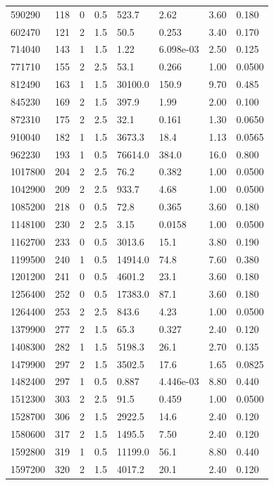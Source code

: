 \documentclass[preview]{standalone}
\begin{document}
{{\begin{tabular}{L{1.2cm}C{1.2cm} C{0.3cm}C{0.5cm} C{1.4cm}C{1.4cm} C{1.4cm}C{1.4cm}}
  590290  &   118  & 0     & 0.5 &  523.7  & 2.62  & 3.60 &  0.180   \\ 
  602470  &   121  & 2     & 1.5 &  50.5  & 0.253  & 3.40 &  0.170   \\ 
  714040  &   143  & 1     & 1.5 &  1.22  & 6.098e-03  & 2.50 &  0.125   \\ 
  771710  &   155  & 2     & 2.5 &  53.1  & 0.266  & 1.00 &  0.0500   \\ 
  812490  &   163  & 1     & 1.5 &  30100.0  & 150.9  & 9.70 &  0.485   \\ 
  845230  &   169  & 2     & 1.5 &  397.9  & 1.99  & 2.00 &  0.100   \\ 
  872310  &   175  & 2     & 2.5 &  32.1  & 0.161  & 1.30 &  0.0650   \\ 
  910040  &   182  & 1     & 1.5 &  3673.3  & 18.4  & 1.13 &  0.0565   \\ 
  962230  &   193  & 1     & 0.5 &  76614.0  & 384.0  & 16.0 &  0.800   \\ 
  1017800  &   204  & 2     & 2.5 &  76.2  & 0.382  & 1.00 &  0.0500   \\ 
  1042900  &   209  & 2     & 2.5 &  933.7  & 4.68  & 1.00 &  0.0500   \\ 
  1085200  &   218  & 0     & 0.5 &  72.8  & 0.365  & 3.60 &  0.180   \\ 
  1148100  &   230  & 2     & 2.5 &  3.15  & 0.0158  & 1.00 &  0.0500   \\ 
  1162700  &   233  & 0     & 0.5 &  3013.6  & 15.1  & 3.80 &  0.190   \\ 
  1199500  &   240  & 1     & 0.5 &  14914.0  & 74.8  & 7.60 &  0.380   \\ 
  1201200  &   241  & 0     & 0.5 &  4601.2  & 23.1  & 3.60 &  0.180   \\ 
  1256400  &   252  & 0     & 0.5 &  17383.0  & 87.1  & 3.60 &  0.180   \\ 
  1264400  &   253  & 2     & 2.5 &  843.6  & 4.23  & 1.00 &  0.0500   \\ 
  1379900  &   277  & 2     & 1.5 &  65.3  & 0.327  & 2.40 &  0.120   \\ 
  1408300  &   282  & 1     & 1.5 &  5198.3  & 26.1  & 2.70 &  0.135   \\ 
  1479900  &   297  & 2     & 1.5 &  3502.5  & 17.6  & 1.65 &  0.0825   \\ 
  1482400  &   297  & 1     & 0.5 &  0.887  & 4.446e-03  & 8.80 &  0.440   \\ 
  1512300  &   303  & 2     & 2.5 &  91.5  & 0.459  & 1.00 &  0.0500   \\ 
  1528700  &   306  & 2     & 1.5 &  2922.5  & 14.6  & 2.40 &  0.120   \\ 
  1580600  &   317  & 2     & 1.5 &  1495.5  & 7.50  & 2.40 &  0.120   \\ 
  1592800  &   319  & 1     & 0.5 &  11199.0  & 56.1  & 8.80 &  0.440   \\ 
  1597200  &   320  & 2     & 1.5 &  4017.2  & 20.1  & 2.40 &  0.120   \\ 
\hline 
\end{tabular} 

}}
\end{document}
